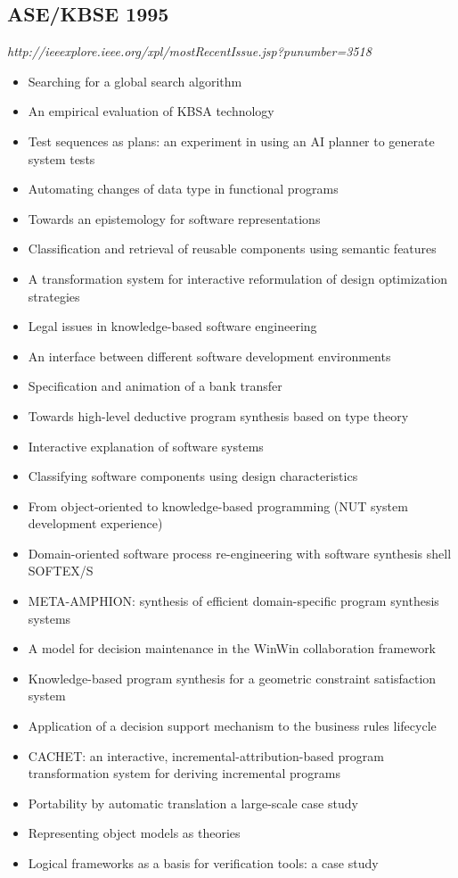 \subsection{ASE/KBSE 1995}

{\small \em http://ieeexplore.ieee.org/xpl/mostRecentIssue.jsp?punumber=3518}

{\small
\begin{itemize}[itemsep=-1ex]
  \item Searching for a global search algorithm
  \item An empirical evaluation of KBSA technology
  \item Test sequences as plans: an experiment in using an AI planner to generate system tests
  \item Automating changes of data type in functional programs
  \item Towards an epistemology for software representations
  \item Classification and retrieval of reusable components using semantic features
  \item A transformation system for interactive reformulation of design optimization strategies
  \item Legal issues in knowledge-based software engineering
  \item An interface between different software development environments
  \item Specification and animation of a bank transfer
  \item Towards high-level deductive program synthesis based on type theory
  \item Interactive explanation of software systems
  \item Classifying software components using design characteristics
  \item From object-oriented to knowledge-based programming (NUT system development experience)
  \item Domain-oriented software process re-engineering with software synthesis shell SOFTEX/S
  \item META-AMPHION: synthesis of efficient domain-specific program synthesis systems
  \item A model for decision maintenance in the WinWin collaboration framework
  \item Knowledge-based program synthesis for a geometric constraint satisfaction system
  \item Application of a decision support mechanism to the business rules lifecycle
  \item CACHET: an interactive, incremental-attribution-based program transformation system for deriving incremental programs
  \item Portability by automatic translation a large-scale case study
  \item Representing object models as theories
  \item Logical frameworks as a basis for verification tools: a case study 
\end{itemize}
}

